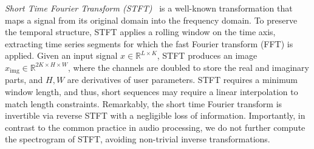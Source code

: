 \documentclass{article}
\begin{document}
\emph{Short Time Fourier Transform (STFT)}~\cite{griffin1984signal} is a well-known transformation that maps a signal from its original domain into the frequency domain. To preserve the temporal structure, STFT applies a rolling window on the time axis, extracting time series segments for which the fast Fourier transform (FFT) is applied. Given an input signal $x\in\mathbb{R}^{L \times K}$, STFT produces an image $x_\text{img} \in \mathbb{R}^{2K \times H \times W}$, where the channels are doubled to store the real and imaginary parts, and $H, W$ are derivatives of user parameters. STFT requires a minimum window length, and thus, short sequences may require a linear interpolation to match length constraints. Remarkably, the short time Fourier transform is invertible via reverse STFT with a negligible loss of information. Importantly, in contrast to the common practice in audio processing, we do not further compute the spectrogram of STFT, avoiding non-trivial inverse transformations.
\end{document}
